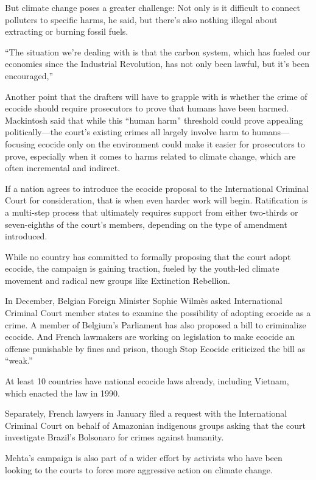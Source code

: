 \documentclass[
]{book}
\begin{document}
But climate change poses a greater challenge: Not only is it difficult to connect polluters to specific harms, he said, but there's also nothing illegal about extracting or burning fossil fuels.

``The situation we're dealing with is that the carbon system, which has fueled our economies since the Industrial Revolution, has not only been lawful, but it's been encouraged,''

Another point that the drafters will have to grapple with is whether the crime of ecocide should require prosecutors to prove that humans have been harmed. Mackintosh said that while this ``human harm'' threshold could prove appealing politically---the court's existing crimes all largely involve harm to humans---focusing ecocide only on the environment could make it easier for prosecutors to prove, especially when it comes to harms related to climate change, which are often incremental and indirect.

If a nation agrees to introduce the ecocide proposal to the International Criminal Court for consideration, that is when even harder work will begin. Ratification is a multi-step process that ultimately requires support from either two-thirds or seven-eighths of the court's members, depending on the type of amendment introduced.

While no country has committed to formally proposing that the court adopt ecocide, the campaign is gaining traction, fueled by the youth-led climate movement and radical new groups like Extinction Rebellion.

In December, Belgian Foreign Minister Sophie Wilmès asked International Criminal Court member states to examine the possibility of adopting ecocide as a crime. A member of Belgium's Parliament has also proposed a bill to criminalize ecocide. And French lawmakers are working on legislation to make ecocide an offense punishable by fines and prison, though Stop Ecocide criticized the bill as ``weak.''

At least 10 countries have national ecocide laws already, including Vietnam, which enacted the law in 1990.

Separately, French lawyers in January filed a request with the International Criminal Court on behalf of Amazonian indigenous groups asking that the court investigate Brazil's Bolsonaro for crimes against humanity.

Mehta's campaign is also part of a wider effort by activists who have been looking to the courts to force more aggressive action on climate change.
\end{document}
